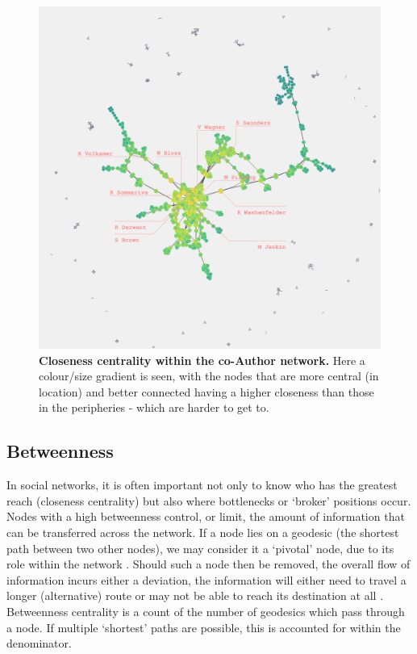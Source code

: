 \begin{figure}[H]
     \centering
         \includegraphics[width=.8\textwidth]{figures_c3/closenessauthor.png}
         
         
        \caption{ \textbf{Closeness centrality within the co-Author network.} Here a colour/size gradient is seen, with the nodes that are more central (in location) and better connected having a higher closeness than those in the peripheries - which are harder to get to.}
        \label{fig:closeauth}
\end{figure}
% 
% 
% 
\subsection{Betweenness}
In social networks, it is often important not only to know who has the greatest reach (closeness centrality) but also where bottlenecks or `broker' positions occur. Nodes with a high betweenness control, or limit, the amount of information that can be transferred across the network. If a node lies on a geodesic (the shortest path between two other nodes), we may consider it a `pivotal' node, due to its role within the network \citep{neoj4}. Should such a node then be removed, the overall flow of information incurs either a deviation, the information will either need to travel a longer (alternative) route or may not be able to reach its destination at all \citep{betweenness, between, betweenfast,examples_centrality}.
Betweenness centrality is a count of the number of geodesics which pass through a node. If multiple `shortest' paths are possible, this is accounted for within the denominator. 


